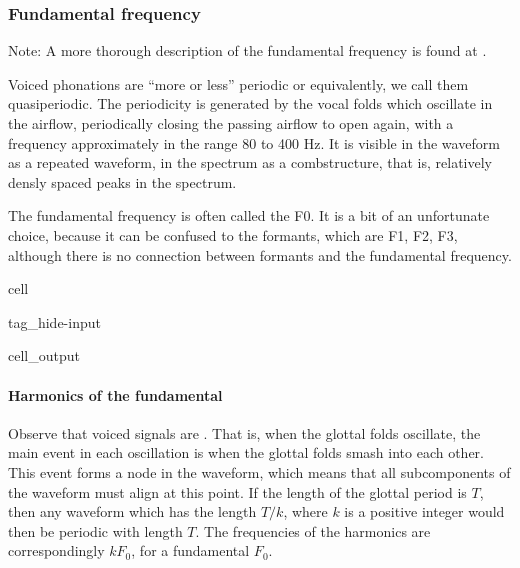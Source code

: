 \documentclass[letterpaper,10pt,english]{jupyterBook}
\begin{document}
\subsubsection{Fundamental frequency}
\label{\detokenize{Representations/Short-time_analysis:fundamental-frequency}}
\sphinxAtStartPar
Note: A more thorough description of the fundamental frequency is found at .

\sphinxAtStartPar
Voiced phonations are “more or less” periodic or equivalently, we call them quasi\sphinxhyphen{}periodic. The periodicity is generated by the vocal folds which oscillate in the airflow, periodically closing the passing airflow to open again, with a frequency approximately in the range 80 to 400 Hz. It is visible in the waveform as a repeated waveform, in the spectrum as a comb\sphinxhyphen{}structure, that is, relatively densly spaced peaks in the spectrum.

\sphinxAtStartPar
The fundamental frequency is often called the F0. It is a bit of an unfortunate choice, because it can be confused to the formants, which are F1, F2, F3, although there is no connection between formants and the fundamental frequency.

\begin{sphinxuseclass}{cell}
\begin{sphinxuseclass}{tag_hide-input}\begin{sphinxVerbatimOutput}

\begin{sphinxuseclass}{cell_output}
\noindent{}

\end{sphinxuseclass}\end{sphinxVerbatimOutput}

\end{sphinxuseclass}
\end{sphinxuseclass}

\paragraph{Harmonics of the fundamental}
\label{\detokenize{Representations/Short-time_analysis:harmonics-of-the-fundamental}}
\sphinxAtStartPar
Observe that voiced signals are . That is, when the glottal folds oscillate, the main event in each oscillation is when the glottal folds smash into each other. This event forms a node in the waveform, which means that all sub\sphinxhyphen{}components of the waveform must align at this point. If the length of the glottal period is \(T\), then any waveform which has the length \(T/k\), where \(k\) is a positive integer would then be periodic with length \(T\). The frequencies of the harmonics are correspondingly \(kF_0\), for a fundamental \(F_0\).
\end{document}
